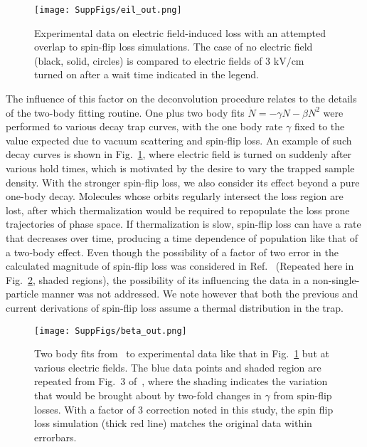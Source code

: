 \documentclass[%
 reprint,
 amsmath,amssymb,
 aps,
prl,
]{revtex4-1}
\begin{document}
\begin{figure}[t]
\texttt{[image: SuppFigs/eil\_out.png]}
\caption{Experimental data on electric field-induced loss with an attempted overlap to spin-flip loss simulations. The case of no electric field (black, solid, circles) is compared to electric fields of $3\text{ kV/cm}$ turned on after a wait time indicated in the legend.
\label{fig:eil}}
\end{figure}

The influence of this factor on the deconvolution procedure relates to the details of the two-body fitting routine.
One plus two body fits $\dot{N}=-\gamma N-\beta N^2$ were performed to various decay trap curves, with the one body rate $\gamma$ fixed to the value expected due to vacuum scattering and spin-flip loss.
An example of such decay curves is shown in Fig.~\ref{fig:eil}, where electric field is turned on suddenly after various hold times, which is motivated by the desire to vary the trapped sample density.
With the stronger spin-flip loss, we also consider its effect beyond a pure one-body decay. Molecules whose orbits regularly intersect the loss region are lost, after which thermalization would be required to repopulate the loss prone trajectories of phase space. If thermalization is slow, spin-flip loss can have a rate that decreases over time, producing a time dependence of population like that of a two-body effect.
Even though the possibility of a factor of two error in the calculated magnitude of spin-flip loss was considered in Ref.~\cite{Stuhl2013} (Repeated here in Fig.~\ref{fig:beta}, shaded regions), the possibility of its influencing the data in a non-single-particle manner was not addressed. We note however that both the previous and current derivations of spin-flip loss assume a thermal distribution in the trap.

\begin{figure}[t]
\texttt{[image: SuppFigs/beta\_out.png]}
\caption{Two body fits from~\cite{Stuhl2013} to experimental data like that in Fig.~\ref{fig:eil} but at various electric fields. The blue data points and shaded region are repeated from Fig.~3 of~\cite{Stuhl2013}, where the shading indicates the variation that would be brought about by two-fold changes in $\gamma$ from spin-flip losses. With a factor of 3 correction noted in this study, the spin flip loss simulation (thick red line) matches the original data within errorbars.\label{fig:beta}}
\end{figure}
\end{document}

